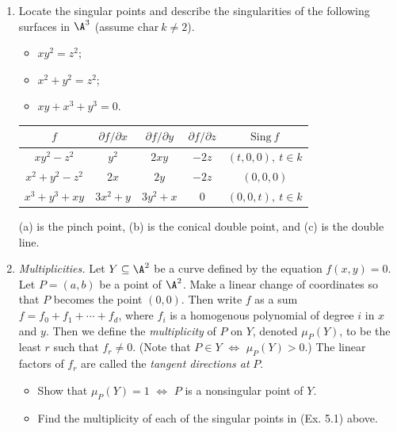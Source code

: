 \documentclass[a4paper]{article}
\begin{document}
\begin{enumerate} [label=\textbf{\arabic*.}, leftmargin=0cm]
    \item[\textbf{2.}] Locate the singular points and describe the singularities of the following surfaces in $\A^3$ (assume $\text{char}~k \neq 2$).
          \begin{itemize}
              \item[(a)] $xy^2 = z^2$;
              \item[(b)] $x^2 + y^2 = z^2$;
              \item[(c)] $xy + x^3 + y^3 = 0$.
          \end{itemize}

          \begin{center}
              \renewcommand{\arraystretch}{1.5}
              \begin{tabular}{c|c|c|c|c}
                  $f$           & $\partial f / \partial x$ & $\partial f / \partial y$ & $\partial f / \partial z$ & $\text{Sing}~f$        \\ \hline
                  $xy^2 - z^2$  & $y^2$                     & $2xy$                     & $-2z$                     & $(t, 0, 0), ~ t \in k$ \\ \hline
                  $x^2+y^2-z^2$ & $2x$                      & $2y$                      & $-2z$                     & $(0, 0, 0)$            \\ \hline
                  $x^3+y^3+xy$  & $3x^2 + y$                & $3y^2 + x$                & $0$                       & $(0, 0, t), ~ t \in k$
              \end{tabular}
          \end{center}
          (a) is the pinch point, (b) is the conical double point, and (c) is the double line.

    \item[\textbf{3.}] \textit{Multiplicities.} Let $Y \subseteq \A^2$ be a curve defined by the equation $f(x, y) = 0$. Let $P = (a, b)$ be a point of $\A^2$. Make a linear change of coordinates so that $P$ becomes the point $(0, 0)$. Then write $f$ as a sum $f = f_0 + f_1 + \cdots + f_d$, where $f_i$ is a homogenous polynomial of degree $i$ in $x$ and $y$. Then we define the \textit{multiplicity} of $P$ on $Y$, denoted $\mu_P(Y)$, to be the least $r$ such that $f_r \neq 0$. (Note that $P \in Y$ $\Leftrightarrow$ $\mu_P(Y) > 0$.) The linear factors of $f_r$ are called the \textit{tangent directions at} $P$.
          \begin{itemize}
              \item[(a)] Show that $\mu_P(Y) = 1$ $\Leftrightarrow$ $P$ is a nonsingular point of $Y$.
              \item[(b)] Find the multiplicity of each of the singular points in (Ex. 5.1) above.
          \end{itemize}


\end{enumerate}
\end{document}
